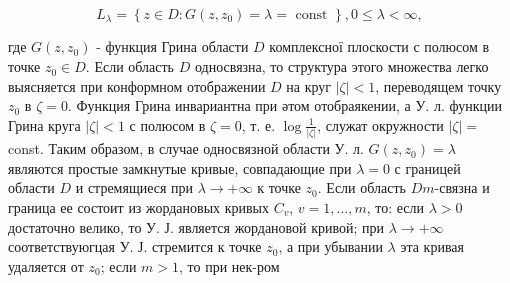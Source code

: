 \documentclass[10pt]{article}
\begin{document}
\[

L_{\lambda}=\left\{z \in D: G\left(z, z_{0}\right)=\lambda=\text { const }\right\}, 0 \leqslant \lambda<\infty,

\]



где $G\left(z, z_{0}\right)$ - функция Грина области $D$ комплексної плоскости с полюсом в точке $z_{0} \in D$. Если область $D$ односвязна, то структура этого множества легко выясняется при конформном отображении $D$ на круг $|\zeta|<1$, переводящем точку $z_{0}$ в $\zeta=0$. Функция Грина инвариантна при әтом отобраякении, а У. л. функции Грина круга $|\zeta|<1$ с полюсом в $\zeta=0$, т. е. $\log \frac{1}{|\zeta|}$, служат окружности $|\zeta|=$ const. Таким образом, в случае односвязной области У. л. $G\left(z, z_{0}\right)=\lambda$ являются простые замкнутые кривые, совпадающие при $\lambda=0$ с границей области $D$ и стремящиеся при $\lambda \rightarrow+\infty$ к точке $z_{0}$. Если область $D m$-связна и граница ее состоит из жордановых кривых $C_{v}$, $v=1, \ldots, m$, то: если $\lambda>0$ достаточно велико, то У. Ј. является жордановой кривой; при $\lambda \rightarrow+\infty$ соответствуюгцая У. Ј. стремится к точке $z_{0}$, а при убывании $\lambda$ эта кривая удаляется от $z_{0}$; если $m>1$, то при нек-ром
\end{document}
